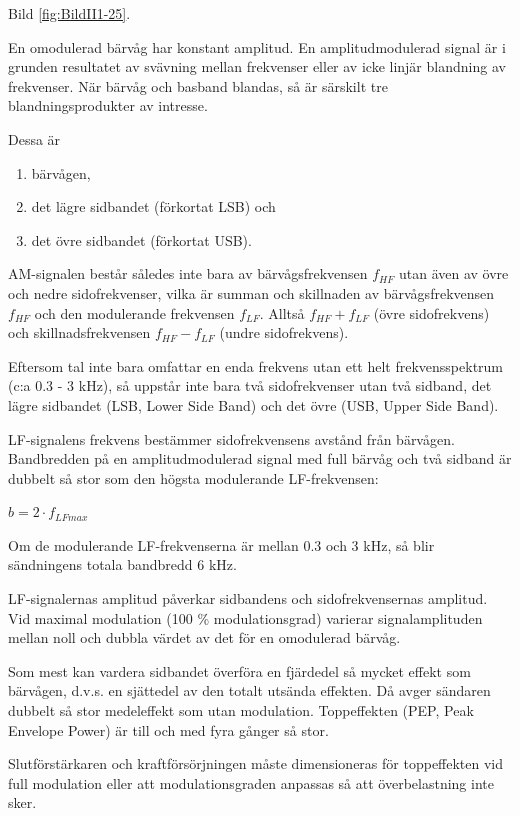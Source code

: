 Bild \ref{fig:BildII1-25}.

En omodulerad bärvåg har konstant amplitud. En amplitudmodulerad signal är i
grunden resultatet av svävning mellan frekvenser eller av icke linjär blandning
av frekvenser. När  bärvåg och basband blandas, så är särskilt tre
blandningsprodukter av intresse.

Dessa är

\begin{enumerate}[label=-,noitemsep]
\item bärvågen,
\item det lägre sidbandet (förkortat LSB) och
\item det övre sidbandet (förkortat USB).
\end{enumerate}

AM-signalen består således inte bara av bärvågsfrekvensen \(f_{HF}\) utan även
av övre och nedre sidofrekvenser, vilka är summan och skillnaden av
bärvågsfrekvensen \(f_{HF}\) och den modulerande frekvensen \(f_{LF}\).
Alltså \(f_{HF} + f_{LF}\) (övre sidofrekvens) och skillnadsfrekvensen
\(f_{HF} - f_{LF}\) (undre sidofrekvens).

Eftersom tal inte bara omfattar en enda frekvens utan ett helt frekvensspektrum
(c:a 0.3 - 3 kHz), så uppstår inte bara två sidofrekvenser utan två sidband, det
lägre sidbandet (LSB, Lower Side Band) och det övre (USB, Upper Side Band).

LF-signalens frekvens bestämmer sidofrekvensens avstånd från bärvågen.
Bandbredden på en amplitudmodulerad signal med full bärvåg och två sidband är
dubbelt så stor som den högsta modulerande LF-frekvensen:

\(b= 2 \cdot f_{LFmax}\)

Om de modulerande LF-frekvenserna är mellan 0.3 och 3 kHz, så blir sändningens
totala bandbredd 6 kHz.

LF-signalernas amplitud påverkar sidbandens och sidofrekvensernas amplitud. Vid
maximal modulation (100 \% modulationsgrad) varierar signalamplituden mellan
noll och dubbla värdet av det för en omodulerad bärvåg.

Som mest kan vardera sidbandet överföra en fjärdedel så mycket effekt som
bärvågen, d.v.s. en sjättedel av den totalt utsända effekten. Då avger sändaren
dubbelt så stor medeleffekt som utan modulation. Toppeffekten (PEP,
Peak Envelope Power) är till och med fyra gånger så stor.

Slutförstärkaren och kraftförsörjningen måste dimensioneras för toppeffekten vid
full modulation eller att modulationsgraden anpassas så att överbelastning inte
sker.

